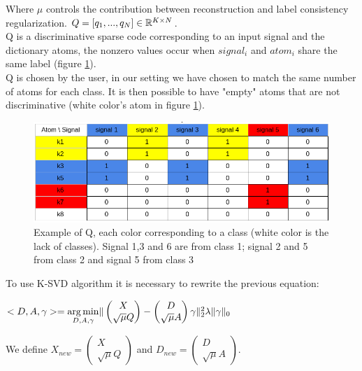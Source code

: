 Where $\mu$ controls the contribution between reconstruction and label consistency regularization. $Q = [q_1,...,q_N] \in \mathbb{R}^{K \times N}$.\\
Q is a discriminative sparse code corresponding to an input signal and the dictionary atoms, the nonzero values occur when $signal_i$ and $atom_i$ share the same label (figure \ref{fig:Q}).\\
Q is chosen by the user, in our setting we have chosen to match the same number of atoms for each class. It is then possible to have "empty" atoms that are not discriminative (white color's atom in figure \ref{fig:Q}).
\begin{figure}[h]
 \centering
 \includegraphics[scale=0.7]{LCKSVDTable.png}
 \caption{Example of Q, each color corresponding to a class (white color is the lack of classes). Signal 1,3 and 6 are from class 1; signal 2 and 5 from class 2 and signal 5 from class 3}
  \label{fig:Q}

\end{figure}
To use K-SVD algorithm it is necessary to  rewrite the previous equation:
\begin{center}
$ <D,A,\gamma> = \underset{D,A,\gamma}{\operatorname*{arg\,min}} \| \begin{pmatrix} 
X  \\
\sqrt{\mu}Q
\end{pmatrix} -  \begin{pmatrix} 
D  \\
\sqrt{\mu}A
\end{pmatrix}\gamma \|^2_2\lambda \|\gamma\|_0$
\end{center}
We define $X_{new}  =  \begin{pmatrix} 
X  \\
\sqrt{\mu}Q
\end{pmatrix}$ and $D_{new} =  \begin{pmatrix} 
D  \\
\sqrt{\mu}A
\end{pmatrix}$. \\ \hspace{0.5cm}
